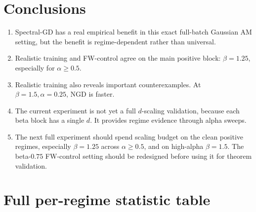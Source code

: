 \documentclass[11pt]{article}
\begin{document}
\section{Conclusions}

\begin{enumerate}[leftmargin=*]
  \item Spectral-GD has a real empirical benefit in this exact full-batch Gaussian AM setting, but the benefit is regime-dependent rather than universal.
  \item Realistic training and FW-control agree on the main positive block: $\beta=1.25$, especially for $\alpha\geq0.5$.
  \item Realistic training also reveals important counterexamples. At $\beta=1.5,\alpha=0.25$, NGD is faster.
  \item The current experiment is not yet a full $d$-scaling validation, because each beta block has a single $d$. It provides regime evidence through alpha sweeps.
  \item The next full experiment should spend scaling budget on the clean positive regimes, especially $\beta=1.25$ across $\alpha\geq0.5$, and on high-alpha $\beta=1.5$. The beta-$0.75$ FW-control setting should be redesigned before using it for theorem validation.
\end{enumerate}

\appendix
\section{Full per-regime statistic table}
\end{document}
